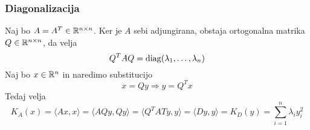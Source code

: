 \subsubsection*{Diagonalizacija}
Naj bo $A = A^T \in \mathbb{R}^{n \times n}$. Ker je $A$ sebi adjungirana, obstaja ortogonalna matrika $Q \in \mathbb{R}^{n \times n}$, da velja
\begin{equation*}
Q^T A Q = \operatorname{diag} (\lambda_1, \ldots, \lambda_n)
\end{equation*}
Naj bo $x \in \mathbb{R}^n$ in naredimo substitucijo
\begin{equation*}
x = Qy \Rightarrow y = Q^T x
\end{equation*}
Tedaj velja
\begin{equation*}
K_A(x) = \langle A x, x \rangle = \langle A Q y, Qy \rangle = \langle Q^T A T y, y \rangle = \langle D y, y \rangle = K_D(y) = \sum_{i=1}^n \lambda_i y_i^2
\end{equation*}

